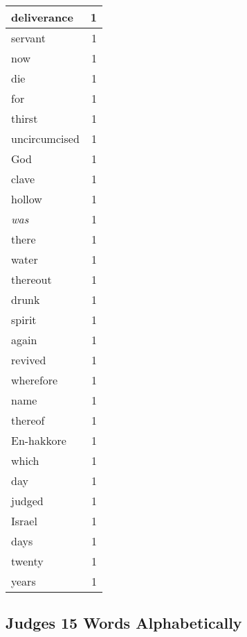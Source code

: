 \begin{center}
\begin{longtable}{l|r}
deliverance & 1\\ \hline 
servant & 1\\ \hline 
now & 1\\ \hline 
die & 1\\ \hline 
for & 1\\ \hline 
thirst & 1\\ \hline 
uncircumcised & 1\\ \hline 
God & 1\\ \hline 
clave & 1\\ \hline 
hollow & 1\\ \hline 
\emph{was} & 1\\ \hline 
there & 1\\ \hline 
water & 1\\ \hline 
thereout & 1\\ \hline 
drunk & 1\\ \hline 
spirit & 1\\ \hline 
again & 1\\ \hline 
revived & 1\\ \hline 
wherefore & 1\\ \hline 
name & 1\\ \hline 
thereof & 1\\ \hline 
En-hakkore & 1\\ \hline 
which & 1\\ \hline 
day & 1\\ \hline 
judged & 1\\ \hline 
Israel & 1\\ \hline 
days & 1\\ \hline 
twenty & 1\\ \hline 
years & 1\\ \hline 
\end{longtable}
\end{center}





\subsection{Judges 15 Words Alphabetically}


\normalsize
 
